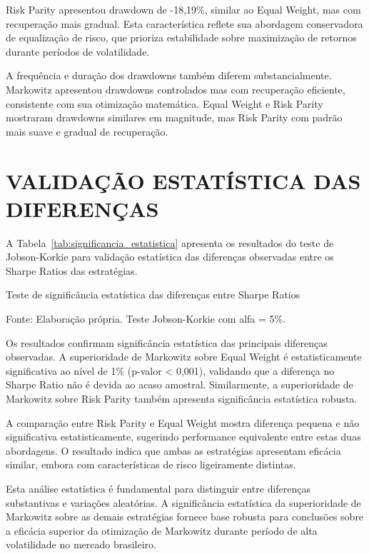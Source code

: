 Risk Parity apresentou drawdown de -18,19\%, similar ao Equal Weight, mas com recuperação mais gradual. Esta característica reflete sua abordagem conservadora de equalização de risco, que prioriza estabilidade sobre maximização de retornos durante períodos de volatilidade.

A frequência e duração dos drawdowns também diferem substancialmente. Markowitz apresentou drawdowns controlados mas com recuperação eficiente, consistente com sua otimização matemática. Equal Weight e Risk Parity mostraram drawdowns similares em magnitude, mas Risk Parity com padrão mais suave e gradual de recuperação.

\section{VALIDAÇÃO ESTATÍSTICA DAS DIFERENÇAS}

A Tabela~\ref{tab:significancia_estatistica} apresenta os resultados do teste de Jobson-Korkie para validação estatística das diferenças observadas entre os Sharpe Ratios das estratégias.

\begin{table}[H]
\centering
\caption{Teste de significância estatística das diferenças entre Sharpe Ratios}
\label{tab:significancia_estatistica}

\footnotesize
Fonte: Elaboração própria. Teste Jobson-Korkie com alfa = 5\%.
\end{table}

Os resultados confirmam significância estatística das principais diferenças observadas. A superioridade de Markowitz sobre Equal Weight é estatisticamente significativa ao nível de 1\% (p-valor < 0,001), validando que a diferença no Sharpe Ratio não é devida ao acaso amostral. Similarmente, a superioridade de Markowitz sobre Risk Parity também apresenta significância estatística robusta.

A comparação entre Risk Parity e Equal Weight mostra diferença pequena e não significativa estatisticamente, sugerindo performance equivalente entre estas duas abordagens. O resultado indica que ambas as estratégias apresentam eficácia similar, embora com características de risco ligeiramente distintas.

Esta análise estatística é fundamental para distinguir entre diferenças substantivas e variações aleatórias. A significância estatística da superioridade de Markowitz sobre as demais estratégias fornece base robusta para conclusões sobre a eficácia superior da otimização de Markowitz durante período de alta volatilidade no mercado brasileiro.

